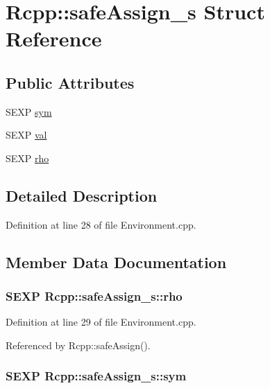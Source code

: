 \hypertarget{structRcpp_1_1safeAssign__s}{
\section{Rcpp::safeAssign\_\-s Struct Reference}
\label{structRcpp_1_1safeAssign__s}
}
\subsection*{Public Attributes}
\begin{DoxyCompactItemize}
\item 
SEXP \hyperlink{structRcpp_1_1safeAssign__s_a3cf0aaa4d5aac2da8b258414e24c2988}{sym}
\item 
SEXP \hyperlink{structRcpp_1_1safeAssign__s_a5173728e0be2b6346fe8f3cdbdc3eb25}{val}
\item 
SEXP \hyperlink{structRcpp_1_1safeAssign__s_ab319a9acb1c47c17e7213f366bf326be}{rho}
\end{DoxyCompactItemize}


\subsection{Detailed Description}


Definition at line 28 of file Environment.cpp.

\subsection{Member Data Documentation}
\hypertarget{structRcpp_1_1safeAssign__s_ab319a9acb1c47c17e7213f366bf326be}{
\subsubsection[{rho}]{\setlength{\rightskip}{0pt plus 5cm}SEXP {\bf Rcpp::safeAssign\_\-s::rho}}}
\label{structRcpp_1_1safeAssign__s_ab319a9acb1c47c17e7213f366bf326be}


Definition at line 29 of file Environment.cpp.

Referenced by Rcpp::safeAssign().\hypertarget{structRcpp_1_1safeAssign__s_a3cf0aaa4d5aac2da8b258414e24c2988}{
\subsubsection[{sym}]{\setlength{\rightskip}{0pt plus 5cm}SEXP {\bf Rcpp::safeAssign\_\-s::sym}}}
\label{structRcpp_1_1safeAssign__s_a3cf0aaa4d5aac2da8b258414e24c2988}


